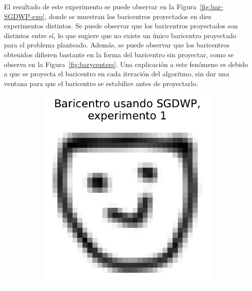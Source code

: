 El resultado de este experimento se puede observar en la Figura~\ref{fig:bar-SGDWP-exp}, donde se muestran los baricentros proyectados en diez experimentos distintos. Se puede observar que los baricentros proyectados son distintos entre sí, lo que sugiere que no existe un único baricentro proyectado para el problema planteado. Además, se puede observar que los baricentros obtenidos difieren bastante en la forma del baricentro sin proyectar, como se observa en la Figura~\ref{fig:barycenters}. Una explicación a este fenómeno es debido a que se proyecta el baricentro en cada iteración del algoritmo, sin dar una ventana para que el baricentro se estabilice antes de proyectarlo.
\begin{figure}[H]
    \centering
    \begin{subfigure}[b]{0.17\textwidth}
        \centering
        \includegraphics[width=\textwidth]{img/sgdwp/bar-SGDWP-exp-01.pdf}
        \label{fig:bar-SGDWP-exp-01}
    \end{subfigure}
    \hfill
    \begin{subfigure}[b]{0.17\textwidth}
        \centering

\end{subfigure}
\end{figure}
